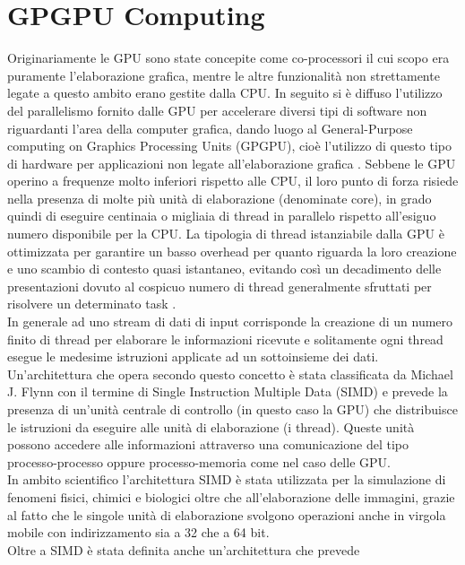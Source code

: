 \section{GPGPU Computing}

Originariamente le GPU sono state concepite
come co-processori il cui scopo
era puramente l'elaborazione grafica, mentre le altre funzionalità
non strettamente legate a questo ambito erano gestite dalla CPU.
In seguito si è diffuso l'utilizzo del parallelismo fornito dalle GPU
per accelerare diversi tipi di software non riguardanti
l'area della computer grafica, dando luogo al General-Purpose computing
on Graphics Processing Units (GPGPU), cioè l'utilizzo di questo tipo di hardware
per applicazioni non legate all'elaborazione grafica \cite{nickolls2010gpu}.
Sebbene le GPU operino a frequenze molto inferiori rispetto alle CPU, il loro
punto di forza risiede nella presenza di molte più unità di elaborazione
(denominate core), in grado quindi di eseguire centinaia o migliaia di thread
in parallelo rispetto all'esiguo numero disponibile per la CPU.
La tipologia di thread
istanziabile dalla GPU è ottimizzata per garantire un basso overhead
per quanto riguarda la loro creazione e uno scambio di contesto quasi
istantaneo, evitando così un decadimento delle presentazioni dovuto al cospicuo
numero di thread generalmente sfruttati per risolvere un determinato task
\cite{kirk2007nvidia}.
\\
In generale ad uno stream di dati di input corrisponde la creazione di un
numero finito di thread per elaborare le informazioni ricevute e solitamente
ogni thread esegue le medesime istruzioni applicate ad un sottoinsieme
dei dati. Un'architettura che opera secondo questo concetto è stata
classificata da Michael J. Flynn con il termine di Single Instruction Multiple 
Data (SIMD)\cite{duncan1990survey} e prevede
la presenza di un'unità centrale di controllo (in questo caso la GPU) che
distribuisce le istruzioni da eseguire alle unità di elaborazione (i thread).
Queste unità possono accedere alle informazioni attraverso una comunicazione
del tipo processo-processo oppure processo-memoria come nel caso delle GPU.
\\
In ambito scientifico l'architettura SIMD è stata utilizzata per la simulazione
di fenomeni fisici, chimici e biologici oltre che all'elaborazione delle
immagini, grazie al fatto che le singole unità di elaborazione svolgono
operazioni anche in virgola mobile con indirizzamento sia a 32 che a 64 bit.
\\
Oltre a SIMD è stata definita anche un'architettura che prevede
